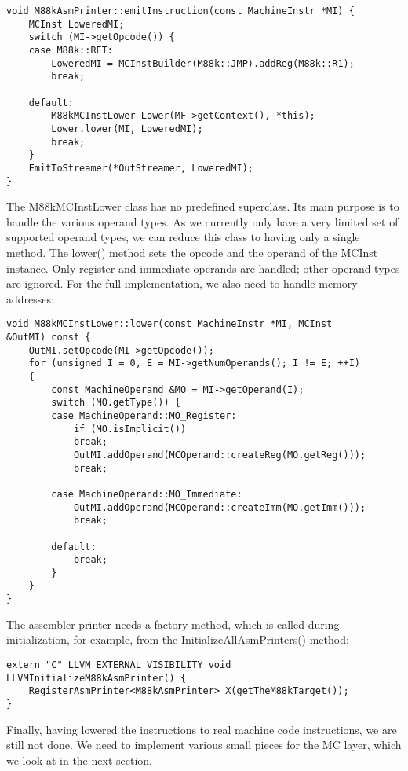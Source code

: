 \begin{lstlisting}[caption={}]
void M88kAsmPrinter::emitInstruction(const MachineInstr *MI) {
	MCInst LoweredMI;
	switch (MI->getOpcode()) {
	case M88k::RET:
		LoweredMI = MCInstBuilder(M88k::JMP).addReg(M88k::R1);
		break;
		
	default:
		M88kMCInstLower Lower(MF->getContext(), *this);
		Lower.lower(MI, LoweredMI);
		break;
	}
	EmitToStreamer(*OutStreamer, LoweredMI);
}
\end{lstlisting}

The M88kMCInstLower class has no predefined superclass. Its main purpose is to handle the various operand types. As we currently only have a very limited set of supported operand types, we can reduce this class to having only a single method. The lower() method sets the opcode and the operand of the MCInst instance. Only register and immediate operands are handled; other operand types are ignored. For the full implementation, we also need to handle memory addresses:\par

\begin{lstlisting}[caption={}]
void M88kMCInstLower::lower(const MachineInstr *MI, MCInst
&OutMI) const {
	OutMI.setOpcode(MI->getOpcode());
	for (unsigned I = 0, E = MI->getNumOperands(); I != E; ++I)
	{
		const MachineOperand &MO = MI->getOperand(I);
		switch (MO.getType()) {
		case MachineOperand::MO_Register:
			if (MO.isImplicit())
			break;
			OutMI.addOperand(MCOperand::createReg(MO.getReg()));
			break;
			
		case MachineOperand::MO_Immediate:
			OutMI.addOperand(MCOperand::createImm(MO.getImm()));
			break;
			
		default:
			break;
		}
	}
}
\end{lstlisting}

The assembler printer needs a factory method, which is called during initialization, for example, from the InitializeAllAsmPrinters() method:\par

\begin{lstlisting}[caption={}]
extern "C" LLVM_EXTERNAL_VISIBILITY void
LLVMInitializeM88kAsmPrinter() {
	RegisterAsmPrinter<M88kAsmPrinter> X(getTheM88kTarget());
}
\end{lstlisting}

Finally, having lowered the instructions to real machine code instructions, we are still not done. We need to implement various small pieces for the MC layer, which we look at in the next section.\par

































